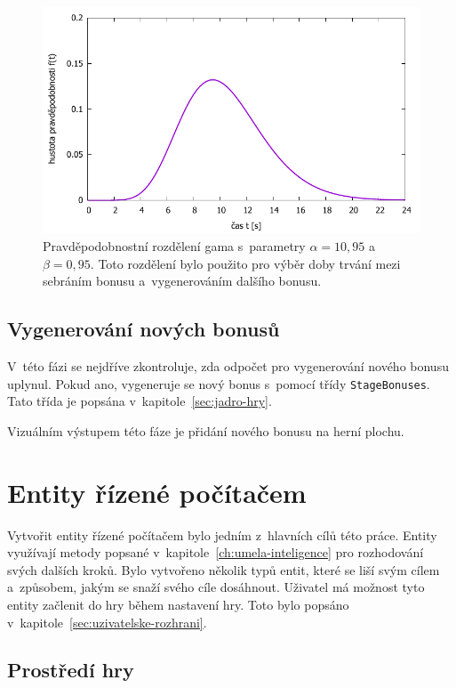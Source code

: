 \begin{figure}[ht]
    \centering
    \includegraphics{doc/obrazky-figures/gamma_distribution.pdf}
    \caption{Pravděpodobnostní rozdělení gama s~parametry $\alpha = 10{,}95$ a~$\beta = 0{,}95$. Toto rozdělení bylo použito pro výběr doby trvání mezi sebráním bonusu a~vygenerováním dalšího bonusu.}
    \label{fig:probability-bonus-countdown}
\end{figure}

\subsection*{Vygenerování nových bonusů}

V~této fázi se nejdříve zkontroluje, zda odpočet pro vygenerování nového bonusu uplynul. Pokud ano, vygeneruje se nový bonus s~pomocí třídy \texttt{StageBonuses}. Tato třída je popsána v~kapitole~\ref{sec:jadro-hry}.

Vizuálním výstupem této fáze je přidání nového bonusu na herní plochu.


\section{Entity řízené počítačem}
\label{sec:entity-rizene-pocitacem}

Vytvořit entity řízené počítačem bylo jedním z~hlavních cílů této práce. Entity využívají metody popsané v~kapitole~\ref{ch:umela-inteligence} pro rozhodování svých dalších kroků. Bylo vytvořeno několik typů entit, které se liší svým cílem a~způsobem, jakým se snaží svého cíle dosáhnout. Uživatel má možnost tyto entity začlenit do hry během nastavení hry. Toto bylo popsáno v~kapitole~\ref{sec:uzivatelske-rozhrani}.

\subsection{Prostředí hry}

